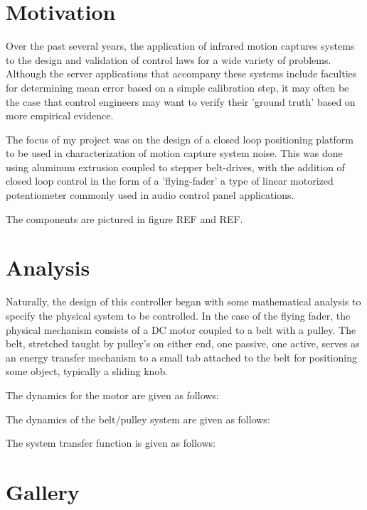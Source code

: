 \documentclass[Nomencl]{SelimArticle}
\begin{document}
\mytitlepage
\tableofcontents
\newpage
\printnomenclature %
\newpage

\section{Motivation}
Over the past several years, the application of infrared motion captures systems to the design and validation of control laws for a wide variety of problems. Although the server applications that accompany these systems include faculties for determining mean error based on a simple calibration step, it may often be the case that control engineers may want to verify their 'ground truth' based on more empirical evidence.

The focus of my project was on the design of  a closed loop positioning platform to be used in characterization of motion capture system noise. This was done using aluminum extrusion coupled to stepper belt-drives, with the addition of closed loop control in the form of a 'flying-fader' a type of linear motorized potentiometer commonly used in audio control panel applications. 

The components are pictured in figure REF and REF.

\section{Analysis}
Naturally, the design of this controller began with some mathematical analysis to specify the physical system to be controlled. In the case of the flying fader, the physical mechanism consists of a DC motor coupled to a belt with a pulley. The belt, stretched taught by pulley's on either end, one passive, one active, serves as an energy transfer mechanism to a small tab attached to the belt for positioning some object, typically a sliding knob. 

The dynamics for the motor are given as follows:

The dynamics of the belt/pulley system are given as follows:

The system transfer function is given as follows:


\section{Gallery}



\end{document}
